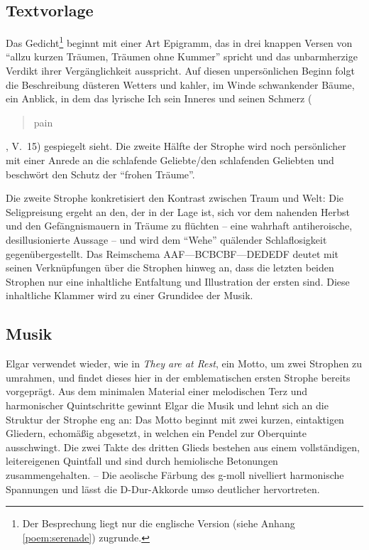 \documentclass[a4paper,11pt,open=any]{scrbook}
\newcommand{\engquote}[1]{\foreignblockquote{english}{#1}}
\begin{document}
\subsection*{Textvorlage}
Das Gedicht\footnote{Der Besprechung liegt nur die englische Version (siehe
Anhang \vref{poem:serenade}) zugrunde.} beginnt mit einer Art Epigramm, das
in drei knappen Versen von \enquote{allzu kurzen Träumen, Träumen ohne
Kummer} spricht und das unbarmherzige Verdikt ihrer Vergänglichkeit
ausspricht.  Auf diesen unpersönlichen Beginn folgt die Beschreibung
düsteren Wetters und kahler, im Winde schwankender Bäume, ein Anblick,
in dem das lyrische Ich sein Inneres und seinen Schmerz (\engquote{pain},
V.~15) gespiegelt sieht.  Die zweite Hälfte der Strophe wird noch
persönlicher mit einer Anrede an die schlafende Geliebte/den schlafenden
Geliebten und beschwört den Schutz der \enquote{frohen Träume}.

Die zweite Strophe konkretisiert den Kontrast zwischen Traum und Welt:
Die Seligpreisung ergeht an den, der in der Lage ist, sich vor dem
nahenden Herbst und den Gefängnismauern in Träume zu flüchten – eine
wahrhaft antiheroische, desillusionierte Aussage – und wird dem
\enquote{Wehe} quälender Schlaflosigkeit gegenübergestellt.  Das
Reimschema \textsf{AAF—BCBCBF—DEDEDF} deutet mit seinen Verknüpfungen
über die Strophen hinweg an, dass die letzten beiden Strophen nur eine
inhaltliche Entfaltung und Illustration der ersten sind.  Diese inhaltliche
Klammer wird zu einer Grundidee der Musik.

\subsection*{Musik}
Elgar verwendet wieder, wie in \textit{They are at Rest}, ein Motto, um
zwei Strophen zu umrahmen, und findet dieses hier in der emblematischen
ersten Strophe bereits vorgeprägt.  Aus dem minimalen Material einer
melodischen Terz und harmonischer Quintschritte gewinnt Elgar die Musik
und lehnt sich an die Struktur der Strophe eng an: Das Motto beginnt mit
zwei kurzen, eintaktigen Gliedern, echomäßig abgesetzt, in welchen ein Pendel
zur Oberquinte ausschwingt.  Die zwei Takte des dritten Glieds bestehen aus
einem vollständigen, leitereigenen Quintfall und sind durch hemiolische
Betonungen zusammengehalten. – Die aeolische Färbung des g-moll nivelliert
harmonische Spannungen und lässt die D-Dur-Akkorde umso deutlicher
hervortreten.
\end{document}
